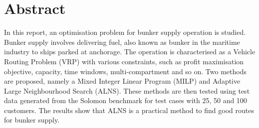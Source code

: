 \chapter*{Abstract}
In this report, an optimisation problem for bunker supply operation is studied. Bunker supply involves delivering fuel, also known as bunker in the maritime industry to ships parked at anchorage. The operation is characterised as a Vehicle Routing Problem (VRP) with various constraints, such as profit maximisation objective, capacity, time windows, multi-compartment and so on. Two methods are proposed, namely a Mixed Integer Linear Program (MILP) and Adaptive Large Neighbourhood Search (ALNS). These methods are then tested using test data generated from the Solomon benchmark for test cases with 25, 50 and 100 customers. The results show that ALNS is a practical method to find good routes for bunker supply.